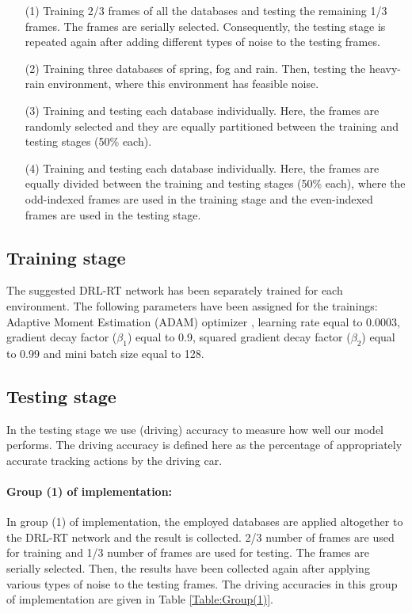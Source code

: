 \documentclass{svproc}
\begin{document}
	\begin{enumerate}
		\item[(1)] Training 2/3 frames of all the databases and testing the remaining 1/3 frames. The frames are serially selected. Consequently, the testing stage is repeated again after adding different types of noise to the testing frames.
		\item[(2)] Training three databases of spring, fog and rain. Then, testing the heavy-rain environment, where this environment has feasible noise. 
		\item[(3)] Training and testing each database individually. Here, the frames are randomly selected and they are equally partitioned between the training and testing stages (50\% each).
		\item[(4)]	Training and testing each database individually. Here, the frames are equally divided between the training and testing stages (50\% each), where the odd-indexed frames are used in the training stage and the even-indexed frames are used in the testing stage.
	\end{enumerate}

	\subsection{Training stage}
		The suggested DRL-RT network has been separately trained for each environment. The following parameters have been assigned for the trainings: Adaptive Moment Estimation (ADAM) optimizer \cite{kingma2014adam}, learning rate equal to 0.0003, gradient decay factor ($\beta_1$) equal to 0.9, squared gradient decay factor ($\beta_2$) equal to 0.99 and mini batch size equal to 128. 
	
	\subsection{Testing stage} 
		In the testing stage we use (driving) accuracy to measure how well our model performs. The driving accuracy is defined	here as the percentage of appropriately accurate tracking actions by the driving car. 
		
	\paragraph{\textbf{Group (1) of implementation:}} 
		In group (1) of implementation, the employed databases are applied altogether to the DRL-RT network and the result is collected. 2/3 number of frames are used for training and 1/3 number of frames are used for testing. The frames are serially selected. Then, the results have been collected again after applying various types of noise to the testing frames. The driving accuracies in this group of implementation are given in Table \ref{Table:Group(1)}.
\end{document}
